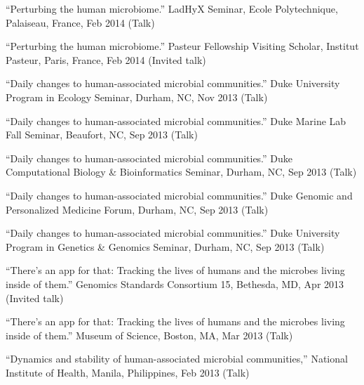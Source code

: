 \documentclass[overlapped,line,11pt]{res}
\begin{document}
\begin{resume}
\begin{revnumerate}[32]
\item {``Perturbing the human microbiome.''  LadHyX Seminar, Ecole
  Polytechnique, Palaiseau, France, Feb 2014 (Talk)}
\vspace*{0mm}

\item {``Perturbing the human microbiome.''
  Pasteur Fellowship Visiting Scholar, Institut Pasteur,
  Paris, France, Feb 2014 (Invited talk)}
\vspace*{0mm}

\item {``Daily changes to human-associated microbial communities.''
  Duke University Program in Ecology Seminar,
  Durham, NC, Nov 2013 (Talk)}
\vspace*{0mm}

\item {``Daily changes to human-associated microbial communities.''
  Duke Marine Lab Fall Seminar,
  Beaufort, NC, Sep 2013 (Talk)}
\vspace*{0mm}

\item {``Daily changes to human-associated microbial communities.''
  Duke Computational Biology \& Bioinformatics Seminar,
  Durham, NC, Sep 2013 (Talk)}
\vspace*{0mm}

\item {``Daily changes to human-associated microbial communities.''
  Duke Genomic and Personalized Medicine Forum,
  Durham, NC, Sep 2013 (Talk)}
\vspace*{0mm}

\item {``Daily changes to human-associated microbial communities.''
  Duke University Program in Genetics \& Genomics Seminar,
  Durham, NC, Sep 2013 (Talk)}
\vspace*{0mm}

\item {``There's an app for that: Tracking the lives of humans and the
  microbes living inside of them.'' Genomics Standards Consortium 15,
  Bethesda, MD, Apr 2013 (Invited talk)}
\vspace*{0mm}

\item {``There's an app for that: Tracking the lives of humans and
  the microbes living inside of them.'' Museum of Science, Boston,
  MA, Mar 2013 (Talk)}
\vspace*{0mm}

\item {``Dynamics and stability of human-associated microbial
  communities,'' National Institute of Health, Manila,
  Philippines, Feb 2013 (Talk)}
\vspace*{0mm}


\end{revnumerate}
\end{resume}
\end{document}
